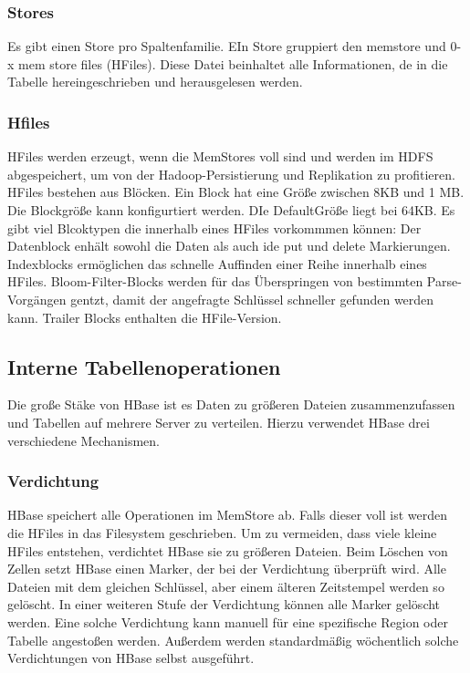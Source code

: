 \subsubsection{Stores}
Es gibt einen Store pro Spaltenfamilie. EIn Store gruppiert den memstore und 0-x mem store files (HFiles). Diese Datei beinhaltet alle Informationen, de in die Tabelle hereingeschrieben und herausgelesen werden.

\subsubsection{Hfiles}
HFiles werden erzeugt, wenn die MemStores voll sind und werden im HDFS abgespeichert, um von der Hadoop-Persistierung und Replikation zu profitieren. HFiles bestehen aus Blöcken. Ein Block hat eine Größe zwischen 8KB und 1 MB. Die Blockgröße kann konfigurtiert werden.  DIe DefaultGröße liegt bei 64KB. Es gibt viel Blcoktypen die innerhalb eines HFiles vorkommmen können: Der Datenblock enhält sowohl die Daten als auch ide put und delete Markierungen. Indexblocks ermöglichen das schnelle Auffinden einer Reihe innerhalb eines HFiles. Bloom-Filter-Blocks werden für das Überspringen von  bestimmten Parse-Vorgängen gentzt, damit der angefragte Schlüssel schneller gefunden werden kann. Trailer Blocks enthalten die HFile-Version.

\subsection{Interne Tabellenoperationen}
Die große Stäke von HBase ist es Daten zu größeren Dateien zusammenzufassen und Tabellen auf mehrere Server zu verteilen. Hierzu verwendet HBase drei verschiedene Mechanismen.

\subsubsection{Verdichtung}
HBase speichert alle Operationen im MemStore ab. Falls dieser voll ist werden die HFiles in das Filesystem geschrieben. Um zu vermeiden, dass viele kleine HFiles entstehen, verdichtet HBase sie zu größeren Dateien. Beim Löschen von Zellen setzt HBase einen Marker, der bei der Verdichtung überprüft wird. Alle Dateien mit dem gleichen Schlüssel, aber einem älteren Zeitstempel werden so gelöscht. In einer weiteren Stufe der Verdichtung können alle Marker gelöscht werden. Eine solche Verdichtung kann manuell für eine spezifische Region oder Tabelle angestoßen werden. Außerdem werden standardmäßig wöchentlich solche Verdichtungen von HBase selbst ausgeführt.

